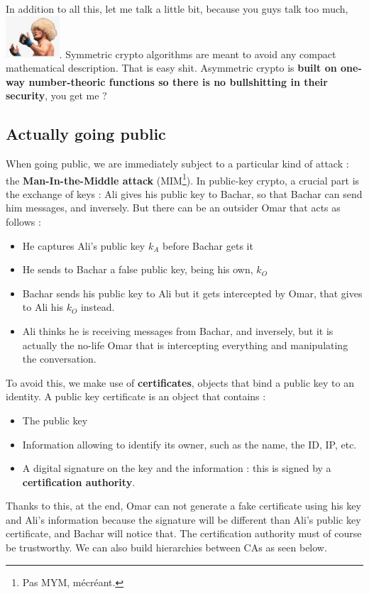 \documentclass[../Cryptography.tex]{subfiles}
\begin{document}
In addition to all this, let me talk a little bit, because you guys talk too much, \includegraphics[width=2cm]{images/khabib.png}. Symmetric crypto algorithms are meant to avoid any compact mathematical description. That is easy shit. Asymmetric crypto is \textbf{built on one-way number-theoric functions so there is no bullshitting in their security}, you get me ?

\subsection{Actually going public}
When going public, we are immediately subject to a particular kind of attack : the \textbf{Man-In-the-Middle attack} (MIM\footnote{Pas MYM, mécréant.}). In public-key crypto, a crucial part is the exchange of keys : Ali gives his public key to Bachar, so that Bachar can send him messages, and inversely. But there can be an outsider Omar that acts as follows : 
\begin{itemize}
    \item He captures Ali's public key $k_A$ before Bachar gets it
    \item He sends to Bachar a false public key, being his own, $k_O$
    \item Bachar sends his public key to Ali but it gets intercepted by Omar, that gives to Ali his $k_O$ instead.
    \item Ali thinks he is receiving messages from Bachar, and inversely, but it is actually the no-life Omar that is intercepting everything and manipulating the conversation. \\
\end{itemize}
To avoid this, we make use of \textbf{certificates}, objects that bind a public key to an identity. A public key certificate is an object that contains :
\begin{itemize}
    \item The public key
    \item Information allowing to identify its owner, such as the name, the ID, IP, etc.
    \item A digital signature on the key and the information : this is signed by a \textbf{certification authority}.
\end{itemize}

Thanks to this, at the end, Omar can not generate a fake certificate using his key and Ali's information because the signature will be different than Ali's public key certificate, and Bachar will notice that. The certification authority must of course be trustworthy.  We can also build hierarchies between CAs as seen below.\\
\end{document}
